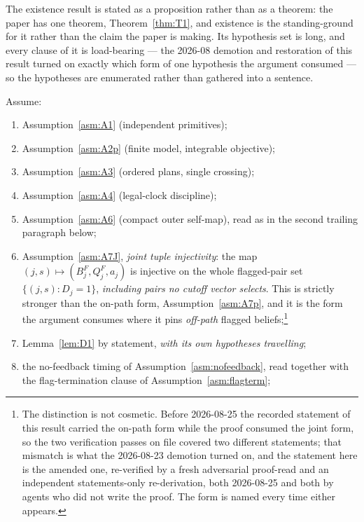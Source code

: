 The existence result is stated as a proposition rather than as a theorem: the paper has one theorem,
Theorem~\ref{thm:T1}, and existence is the standing-ground for it rather than the claim the paper is
making. Its hypothesis set is long, and every clause of it is load-bearing --- the 2026-08
demotion and restoration of this result turned on exactly which form of one hypothesis the argument
consumed --- so the hypotheses are enumerated rather than gathered into a sentence.

\begin{proposition}
\label{prop:P1}
Assume:
\begin{enumerate}[label=(P-\arabic*),leftmargin=3.2em,itemsep=3pt]
\item Assumption~\ref{asm:A1} (independent primitives);
\item Assumption~\ref{asm:A2p} (finite model, integrable objective);
\item Assumption~\ref{asm:A3} (ordered plans, single crossing);
\item Assumption~\ref{asm:A4} (legal-clock discipline);
\item Assumption~\ref{asm:A6} (compact outer self-map), read as in the second trailing paragraph
  below;
\item Assumption~\ref{asm:A7J}, \emph{joint tuple injectivity}: the map
  $(j,s) \mapsto (B_j^F, Q_j^F, a_j)$ is injective on the whole flagged-pair set
  $\{(j,s) : D_j = 1\}$, \emph{including pairs no cutoff vector selects}. This is strictly stronger
  than the on-path form, Assumption~\ref{asm:A7p}, and it is the form the argument consumes where it
  pins \emph{off-path} flagged beliefs;\footnote{The distinction is not cosmetic. Before 2026-08-25
  the recorded statement of this result carried the on-path form while the proof consumed the joint
  form, so the two verification passes on file covered two different statements; that mismatch is
  what the 2026-08-23 demotion turned on, and the statement here is the amended one, re-verified by
  a fresh adversarial proof-read and an independent statements-only re-derivation, both 2026-08-25
  and both by agents who did not write the proof. The form is named every time either appears.}
\item Lemma~\ref{lem:D1} by statement, \emph{with its own hypotheses travelling};
\item the no-feedback timing of Assumption~\ref{asm:nofeedback}, read together with the
  flag-termination clause of Assumption~\ref{asm:flagterm};

\end{enumerate}
\end{proposition}
